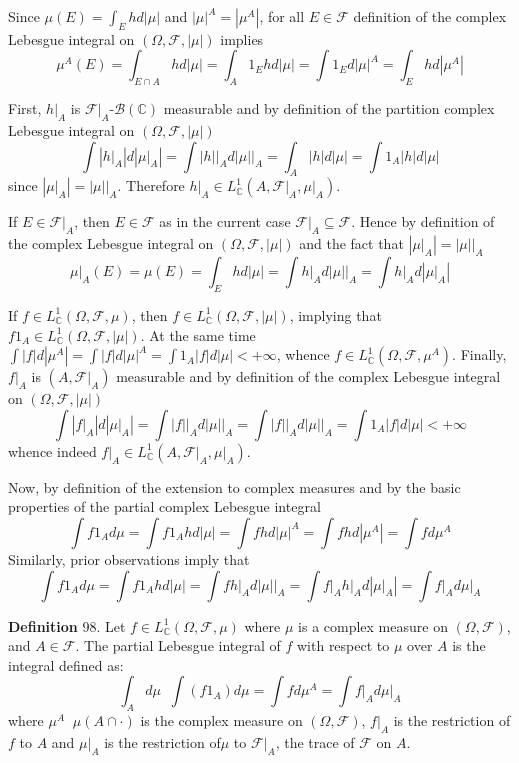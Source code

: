 \documentclass[a4paper]{article}
\newcommand{\brac}[1]{\left ( #1 \right )}
\newcommand{\induc}[1]{\left . #1 \right \vert}
\newcommand{\abs}[1]{\left | #1 \right |}
\newcommand{\Cplx}{\mathbb{C}}
\newcommand{\Fcal}{\mathcal{F}}
\newcommand{\borel}[1]{\mathcal{B}\brac{#1}}
\newcommand{\defn}{\mathop{\overset{\Delta}{=}}\nolimits}
\begin{document}
Since $\mu\brac{E} = \int_E h d\abs{\mu}$ and $\abs{\mu}^A = \abs{\mu^A}$, for all $E\in \Fcal$ definition of the complex Lebesgue integral on $\brac{\Omega, \Fcal, \abs{\mu}}$ implies \[\mu^A\brac{E} = \int_{E\cap A} h d\abs{\mu} = \int_A 1_E h d\abs{\mu} = \int 1_E d\abs{\mu}^A = \int_E h d\abs{\mu^A}\]

First, $\induc{h}_A$ is $\induc{\Fcal}_A$-$\borel{\Cplx}$ measurable and by definition of the partition complex Lebesgue integral on $\brac{\Omega, \Fcal, \abs{\mu}}$ \[\int \abs{\induc{h}_A} d\abs{\induc{\mu}_A} = \int \induc{\abs{h}}_A d\induc{\abs{\mu}}_A = \int_A \abs{h} d\abs{\mu} = \int 1_A \abs{h} d\abs{\mu}\] since $\abs{\induc{\mu}_A} = \induc{\abs{\mu}}_A$. Therefore $\induc{h}_A\in L^1_\Cplx\brac{A, \induc{\Fcal}_A, \induc{\mu}_A}$.

If $E\in \induc{\Fcal}_A$, then $E\in \Fcal$ as in the current case $\induc{\Fcal}_A\subseteq \Fcal$. Hence by definition of the complex Lebesgue integral on $\brac{\Omega, \Fcal, \abs{\mu}}$ and the fact that $\abs{\induc{\mu}_A} = \induc{\abs{\mu}}_A$ \[\induc{\mu}_A\brac{E} = \mu\brac{E} = \int_E h d\abs{\mu} = \int \induc{h}_A d\induc{\abs{\mu}}_A = \int \induc{h}_A d\abs{\induc{\mu}_A}\]

If $f\in L^1_\Cplx\brac{\Omega, \Fcal, \mu}$, then $f\in L^1_\Cplx\brac{\Omega, \Fcal, \abs{\mu}}$, implying that $f 1_A \in L^1_\Cplx\brac{\Omega, \Fcal, \abs{\mu}}$. At the same time $\int \abs{f} d\abs{\mu^A} = \int \abs{f} d\abs{\mu}^A = \int 1_A \abs{f} d\abs{\mu}<+\infty$, whence $f\in L^1_\Cplx\brac{\Omega, \Fcal, \mu^A}$. Finally, $\induc{f}_A$ is $\brac{A, \induc{\Fcal}_A}$ measurable and by definition of the complex Lebesgue integral on $\brac{\Omega, \Fcal, \abs{\mu}}$ \[\int \abs{\induc{f}_A} d\abs{\induc{\mu}_A} = \int \induc{\abs{f}}_A d\induc{\abs{\mu}}_A = \int \induc{\abs{f}}_A d\induc{\abs{\mu}}_A = \int 1_A \abs{f} d\abs{\mu} < +\infty\] whence indeed $\induc{f}_A \in L^1_\Cplx\brac{A, \induc{\Fcal}_A, \induc{\mu}_A}$.

Now, by definition of the extension to complex measures and by the basic properties of the partial complex Lebesgue integral \[\int f 1_A d\mu = \int f 1_A h d\abs{\mu} = \int f h d\abs{\mu}^A  = \int f h d\abs{\mu^A} = \int f d\mu^A \] Similarly, prior observations imply that \[\int f 1_A d\mu = \int f 1_A h d\abs{\mu} = \int \induc{f h}_A d\induc{\abs{\mu}}_A = \int \induc{f}_A \induc{h}_A d\abs{\induc{\mu}_A} = \int \induc{f}_A d\induc{\mu}_A\]

\noindent \textbf{Definition} 98.
Let $f\in L^1_\Cplx\brac{\Omega, \Fcal, \mu}$ where $\mu$ is a complex measure on $\brac{\Omega ,\Fcal}$, and $A\in \Fcal$. The partial Lebesgue integral of $f$ with respect to $\mu$ over $A$ is the integral defined as:\[\int_A d\mu \defn \int \brac{f 1_A} d\mu = \int f d\mu^A = \int \induc{f}_A d\induc{\mu}_A\] where $\mu^A\defn \mu\brac{A\cap \cdot}$ is the complex measure on $\brac{\Omega, \Fcal}$, $\induc{f}_A$ is the restriction of $f$ to $A$ and $\induc{\mu}_A$ is the restriction of$\mu$ to $\induc{\Fcal}_A$, the trace of $\Fcal$ on $A$.
\end{document}
